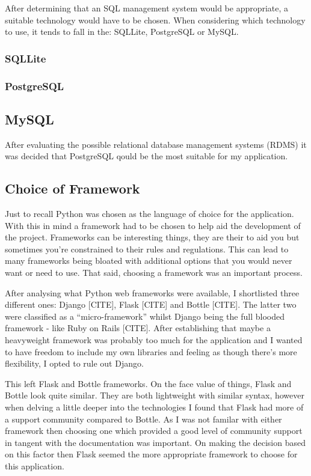 After determining that an SQL management system would be appropriate, a suitable technology would have to be chosen. When considering which technology to use, it tends to fall in the: SQLLite, PostgreSQL or MySQL.

\subsubsection{SQLLite}


\subsubsection{PostgreSQL}

\subsection{MySQL}


\begin{flushleft}
After evaluating the possible relational database management systems (RDMS) it was decided that PostgreSQL qould be the most suitable for my application.
\end{flushleft}

\subsection{Choice of Framework}

Just to recall Python was chosen as the language of choice for the application. With this in mind a framework had to be chosen to help aid the development of the project. Frameworks can be interesting things, they are their to aid you but sometimes you're constrained to their rules and regulations. This can lead to many frameworks being bloated with additional options that you would never want or need to use. That said, choosing a framework was an important process.

After analysing what Python web frameworks were available, I shortlisted three different ones: Django [CITE], Flask [CITE] and Bottle [CITE]. The latter two were classified as a  ``micro-framework'' whilst Django being the full blooded framework - like Ruby on Rails [CITE].  After establishing that maybe a heavyweight framework was probably too much for the application and I wanted to have freedom to include my own libraries and feeling as though there's more flexibility, I opted to rule out Django.

This left Flask and Bottle frameworks. On the face value of things, Flask and Bottle look quite similar. They are both lightweight with similar syntax, however when delving a little deeper into the technologies I found that Flask had more of a support community compared to Bottle. As I was not familar with either framework then choosing one which provided a good level of community support in tangent with the documentation was important. On making the decision based on this factor then Flask seemed the more appropriate framework to choose for this application.

